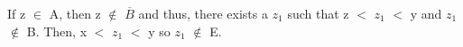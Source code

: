 	If z $\in$ A, then z $\not \in$ $\overline{B}$ and thus,
	there exists a $z_1$ such that z $<$ $z_1$ $<$ y and $z_1$ $\not \in$ B.
	Then, x $<$ $z_1$ $<$ y so $z_1$ $\not \in$ E.

















































